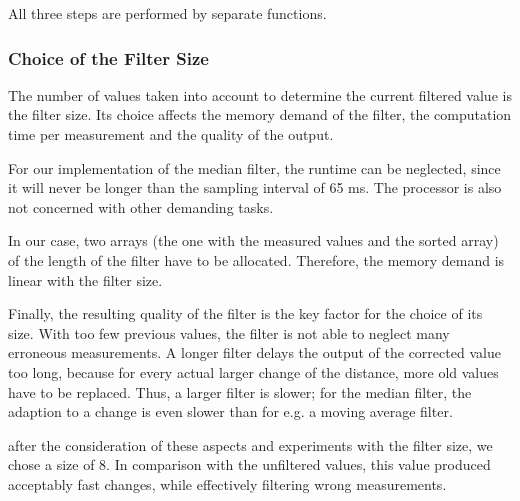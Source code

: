 All three steps are performed by separate functions.

\subsubsection{Choice of the Filter Size}
\label{subsubsec:filterDepth}
The number of values taken into account to determine the current filtered 
value is the filter size. Its choice affects the memory demand of the filter,
the computation time per measurement and the quality of the output. 

For our implementation of the median filter, the runtime can be neglected,
 since it will never be longer than the sampling interval of 65 ms. The 
 processor is also not concerned with other demanding tasks.

In our case, two arrays (the one with the measured values and the sorted array)
of the length of the filter have to be allocated. Therefore, the memory demand 
is linear with the filter size.

Finally, the resulting quality of the filter is the key factor for the choice
of its size. With too few previous values, the filter is not able to
neglect many erroneous measurements. A longer filter delays the output of
the corrected value too long, because for every actual larger change of
the distance, more old values have to be replaced. Thus, a larger filter is 
slower; for the median filter, the adaption to a change is even slower than
for e.g. a moving average filter.

after the consideration of these aspects and experiments with the filter size,
we chose a size of 8. In comparison with the unfiltered values, this value
produced acceptably fast changes, while effectively filtering wrong measurements.







